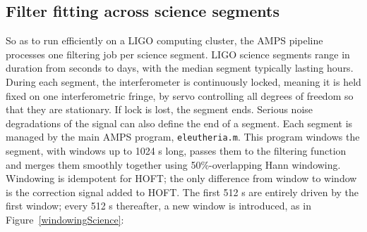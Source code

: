 
        \subsection{Filter fitting across science segments}
        \label{filter_fitting-out-of-loop}

So as to run efficiently on a LIGO computing cluster, the AMPS pipeline processes one filtering job per science segment. LIGO science segments range in duration from seconds to days, with the median segment typically lasting hours. During each segment, the interferometer is continuously locked, meaning it is held fixed on one interferometric fringe, by servo controlling all degrees of freedom so that they are stationary. If lock is lost, the segment ends. Serious noise degradations of the signal can also define the end of a segment. Each segment is managed by the main AMPS program, \texttt{eleutheria.m}. This program windows the segment, with windows up to 1024 s long, passes them to the filtering function and merges them smoothly together using 50\%-overlapping Hann windowing. Windowing is idempotent for HOFT; the only difference from window to window is the correction signal added to HOFT. The first 512 s are entirely driven by the first window; every 512 s thereafter, a new window is introduced, as in Figure~\ref{windowingScience}: 

